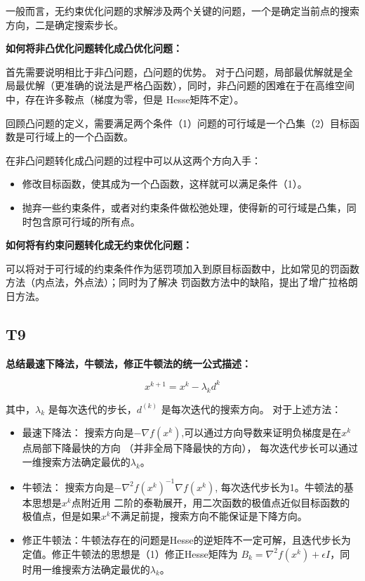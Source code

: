 \documentclass[a4paper]{article}
\begin{document}
    一般而言，无约束优化问题的求解涉及两个关键的问题，一个是确定当前点的搜索方向，二是确定搜索步长。


    \textbf{如何将非凸优化问题转化成凸优化问题：}

    首先需要说明相比于非凸问题，凸问题的优势。
    对于凸问题，局部最优解就是全局最优解（更准确的说法是严格凸函数），同时，非凸问题的困难在于在高维空间中，存在许多鞍点（梯度为零，但是
    Hesse矩阵不定）。

    回顾凸问题的定义，需要满足两个条件（1）问题的可行域是一个凸集（2）目标函数是可行域上的一个凸函数。

    在非凸问题转化成凸问题的过程中可以从这两个方向入手：
    \begin{itemize}
        \item 修改目标函数，使其成为一个凸函数，这样就可以满足条件（1）。
        \item 抛弃一些约束条件，或者对约束条件做松弛处理，使得新的可行域是凸集，同时包含原可行域的所有点。
    \end{itemize}




    

\textbf{如何将有约束问题转化成无约束优化问题：}

    可以将对于可行域的约束条件作为惩罚项加入到原目标函数中，比如常见的罚函数方法（内点法，外点法）；同时为了解决
    罚函数方法中的缺陷，提出了增广拉格朗日方法。

    \subsection*{T9}
    \textbf{总结最速下降法，牛顿法，修正牛顿法的统一公式描述：}

    \begin{equation*}
        x^{k+1} = x^{k} - \lambda_k d^{k}
    \end{equation*}

    其中，$\lambda_k$ 是每次迭代的步长，$d^{(k)}$ 是每次迭代的搜索方向。
    对于上述方法：

    \begin{itemize}
        \item 最速下降法： 搜索方向是$-\nabla f(x^k)$,可以通过方向导数来证明负梯度是在$x^k$点局部下降最快的方向
        （并非全局下降最快的方向）， 每次迭代步长可以通过一维搜索方法确定最优的$\lambda_k$。
        \item 牛顿法： 搜索方向是$-\nabla^2 f(x^k)^{-1} \nabla f(x^k)$, 每次迭代步长为1。牛顿法的基本思想是$x^k$点附近用
        二阶的泰勒展开，用二次函数的极值点近似目标函数的极值点，但是如果$x^k$不满足前提，搜索方向不能保证是下降方向。
        \item 修正牛顿法：牛顿法存在的问题是Hesse的逆矩阵不一定可解，且迭代步长为定值。修正牛顿法的思想是（1）修正Hesse矩阵为
        $B_k = \nabla^2f(x^k) + \epsilon I$，同时用一维搜索方法确定最优的$\lambda_k$。
    \end{itemize}
\end{document}
